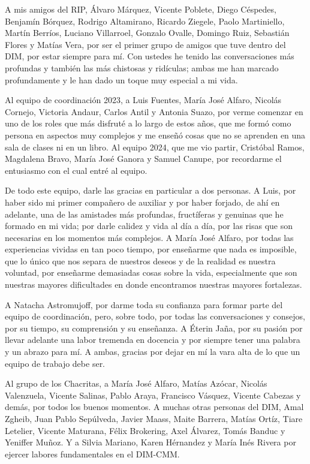 A mis amigos del RIP, Álvaro Márquez, Vicente Poblete, Diego Céspedes, Benjamín Bórquez, Rodrigo Altamirano, Ricardo Ziegele, Paolo Martiniello, Martín Berríos, Luciano Villarroel, Gonzalo Ovalle, Domingo Ruiz, Sebastián Flores y Matías Vera, por ser el primer grupo de amigos que tuve dentro del DIM, por estar siempre para mí. Con ustedes he tenido las conversaciones más profundas y también las más chistosas y ridículas; ambas me han marcado profundamente y le han dado un toque muy especial a mi vida.

Al equipo de coordinación 2023, a Luis Fuentes, María José Alfaro, Nicolás Cornejo, Victoria Andaur, Carlos Antil y Antonia Suazo, por verme comenzar en uno de los roles que más disfruté a lo largo de estos años, que me formó como persona en aspectos muy complejos y me enseñó cosas que no se aprenden en una sala de clases ni en un libro. Al equipo 2024, que me vio partir, Cristóbal Ramos, Magdalena Bravo, María José Ganora y Samuel Canupe, por recordarme el entusiasmo con el cual entré al equipo.

De todo este equipo, darle las gracias en particular a dos personas. A Luis, por haber sido mi primer compañero de auxiliar y por haber forjado, de ahí en adelante, una de las amistades más profundas, fructíferas y genuinas que he formado en mi vida; por darle calidez y vida al día a día, por las risas que son necesarias en los momentos más complejos. A María José Alfaro, por todas las experiencias vividas en tan poco tiempo, por enseñarme que nada es imposible, que lo único que nos separa de nuestros deseos y de la realidad es nuestra voluntad, por enseñarme demasiadas cosas sobre la vida, especialmente que son nuestras mayores dificultades en donde encontramos nuestras mayores fortalezas.

A Natacha Astromujoff, por darme toda su confianza para formar parte del equipo de coordinación, pero, sobre todo, por todas las conversaciones y consejos, por su tiempo, su comprensión y su enseñanza. A Éterin Jaña, por su pasión por llevar adelante una labor tremenda en docencia y por siempre tener una palabra y un abrazo para mí. A ambas, gracias por dejar en mí la vara alta de lo que un equipo de trabajo debe ser.

Al grupo de los Chacritas, a María José Alfaro, Matías Azócar, Nicolás Valenzuela, Vicente Salinas, Pablo Araya, Francisco Vásquez, Vicente Cabezas y demás, por todos los buenos momentos. A muchas otras personas del DIM, Amal Zgheib, Juan Pablo Sepúlveda, Javier Maass, Maite Barrera, Matías Ortíz, Tiare Letelier, Vicente Maturana, Félix Brokering, Axel Álvarez, Tomás Banduc y Yeniffer Muñoz. Y a Silvia Mariano, Karen Hérnandez y María Inés Rivera por ejercer labores fundamentales en el DIM-CMM.

